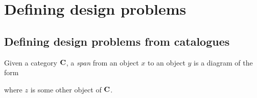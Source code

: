 \section{Defining design problems}
\subsection{Defining design problems from catalogues}
\begin{shaded}
\begin{definition}[Span]
Given a category $\mathbf{C}$, a \emph{span} from an object $x$ to an object $y$ is a diagram of the form
\begin{center}
\end{center}
where $z$ is some other object of $\mathbf{C}$. 
\end{definition}
\end{shaded}
